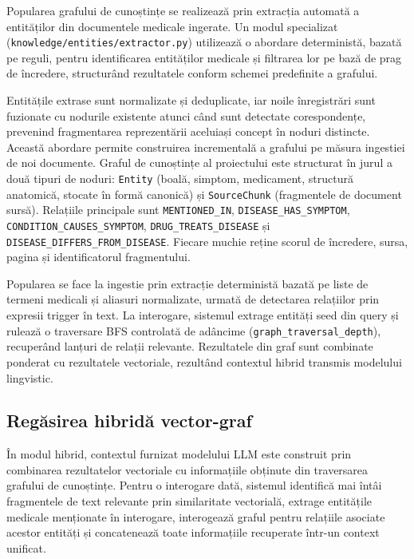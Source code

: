 \documentclass[12pt, a4paper, oneside, romanian]{teza-upb}
\begin{document}
Popularea grafului de cunoștințe se realizează prin extracția automată a entităților din documentele medicale ingerate. Un modul specializat (\texttt{knowledge/entities/extractor.py}) utilizează o abordare deterministă, bazată pe reguli, pentru identificarea entităților medicale și filtrarea lor pe bază de prag de încredere, structurând rezultatele conform schemei predefinite a grafului.

Entitățile extrase sunt normalizate și deduplicate, iar noile înregistrări sunt fuzionate cu nodurile existente atunci când sunt detectate corespondențe, prevenind fragmentarea reprezentării aceluiași concept în noduri distincte. Această abordare permite construirea incrementală a grafului pe măsura ingestiei de noi documente.
Graful de cunoștințe al proiectului este structurat în jurul a două tipuri de noduri: \texttt{Entity} (boală, simptom, medicament, structură anatomică, stocate în formă canonică) și \texttt{SourceChunk} (fragmentele de document sursă). Relațiile principale sunt \texttt{MENTIONED\_IN}, \texttt{DISEASE\_HAS\_SYMPTOM}, \texttt{CONDITION\_CAUSES\_SYMPTOM}, \texttt{DRUG\_TREATS\_DISEASE} și \texttt{DISEASE\_DIFFERS\_FROM\_DISEASE}. Fiecare muchie reține scorul de încredere, sursa, pagina și identificatorul fragmentului.

Popularea se face la ingestie prin extracție deterministă bazată pe liste de termeni medicali și aliasuri normalizate, urmată de detectarea relațiilor prin expresii trigger în text. La interogare, sistemul extrage entități seed din query și rulează o traversare BFS controlată de adâncime (\texttt{graph\_traversal\_depth}), recuperând lanțuri de relații relevante. Rezultatele din graf sunt combinate ponderat cu rezultatele vectoriale, rezultând contextul hibrid transmis modelului lingvistic.

\subsection{Regăsirea hibridă vector-graf}

În modul hibrid, contextul furnizat modelului LLM este construit prin combinarea rezultatelor vectoriale cu informațiile obținute din traversarea grafului de cunoștințe. Pentru o interogare dată, sistemul identifică mai întâi fragmentele de text relevante prin similaritate vectorială, extrage entitățile medicale menționate în interogare, interogează graful pentru relațiile asociate acestor entități și concatenează toate informațiile recuperate într-un context unificat.
\end{document}
